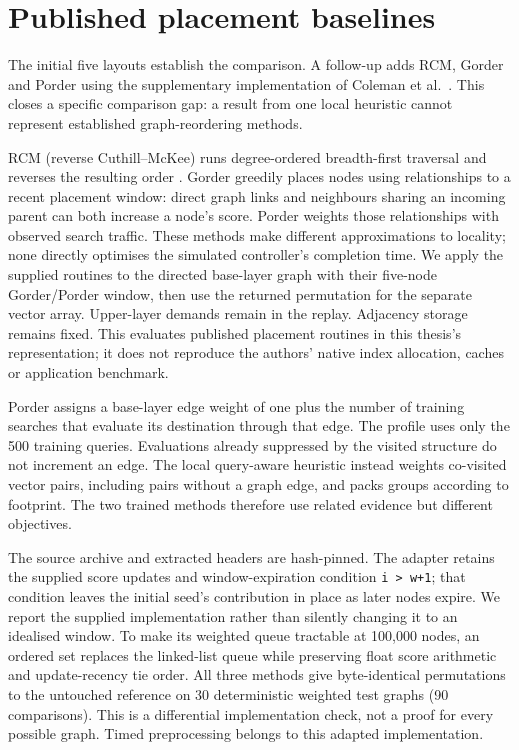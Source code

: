\section{Published placement baselines}
The initial five layouts establish the comparison. A follow-up adds RCM, Gorder and Porder using the supplementary implementation of Coleman et al.~\cite{coleman}. This closes a specific comparison gap: a result from one local heuristic cannot represent established graph-reordering methods.

RCM (reverse Cuthill--McKee) runs degree-ordered breadth-first traversal and reverses the resulting order \cite{cuthill,coleman}. Gorder \cite{gorder} greedily places nodes using relationships to a recent placement window: direct graph links and neighbours sharing an incoming parent can both increase a node's score. Porder weights those relationships with observed search traffic. These methods make different approximations to locality; none directly optimises the simulated controller's completion time. We apply the supplied routines to the directed base-layer graph with their five-node Gorder/Porder window, then use the returned permutation for the separate vector array. Upper-layer demands remain in the replay. Adjacency storage remains fixed. This evaluates published placement routines in this thesis's representation; it does not reproduce the authors' native index allocation, caches or application benchmark.

Porder assigns a base-layer edge weight of one plus the number of training searches that evaluate its destination through that edge. The profile uses only the 500 training queries. Evaluations already suppressed by the visited structure do not increment an edge. The local query-aware heuristic instead weights co-visited vector pairs, including pairs without a graph edge, and packs groups according to footprint. The two trained methods therefore use related evidence but different objectives.

The source archive and extracted headers are hash-pinned. The adapter retains the supplied score updates and window-expiration condition \texttt{i > w+1}; that condition leaves the initial seed's contribution in place as later nodes expire. We report the supplied implementation rather than silently changing it to an idealised window. To make its weighted queue tractable at 100,000 nodes, an ordered set replaces the linked-list queue while preserving float score arithmetic and update-recency tie order. All three methods give byte-identical permutations to the untouched reference on 30 deterministic weighted test graphs (90 comparisons). This is a differential implementation check, not a proof for every possible graph. Timed preprocessing belongs to this adapted implementation.
